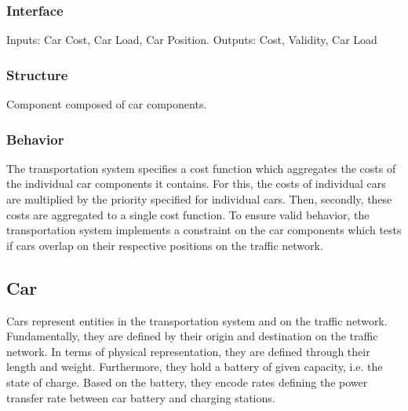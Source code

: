 \subsubsection{Interface}

Inputs: Car Cost, Car Load, Car Position. Outputs: Cost, Validity, Car Load

\subsubsection{Structure}

Component composed of car components.

\subsubsection{Behavior}

The transportation system specifies a cost function which aggregates the costs of the individual car components it contains. For this, the costs of individual cars are multiplied by the priority specified for individual cars. Then, secondly, these costs are aggregated to a single cost function. To ensure valid behavior, the transportation system implements a constraint on the car components which tests if cars overlap on their respective positions on the traffic network.

\subsection{Car}

Cars represent entities in the transportation system and on the traffic network. Fundamentally, they are defined by their origin and destination on the traffic network. In terms of physical representation, they are defined through their length and weight. Furthermore, they hold a battery of given capacity, i.e. the state of charge. Based on the battery, they encode rates defining the power transfer rate between car battery and charging stations.


